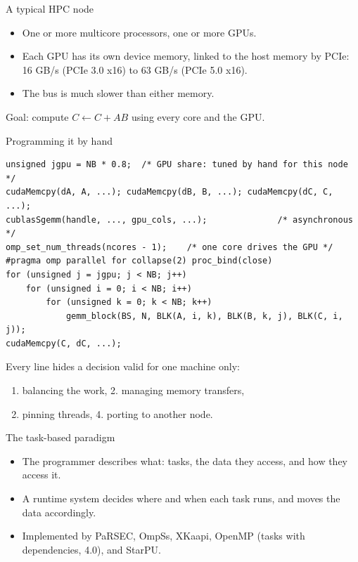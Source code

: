 \documentclass[presentation, aspectratio=169]{beamer}
\begin{document}
\begin{frame}[label={sec:orgd8b34ab}]{A typical HPC node}
\begin{itemize}
\item One or more multicore processors, one or more GPUs.
\item Each GPU has its own \alert{device memory}, linked to the \alert{host memory}
by PCIe: 16 GB/s (PCIe 3.0 x16) to 63 GB/s (PCIe 5.0 x16).
\item The bus is much slower than either memory.
\end{itemize}

Goal: compute \(C \leftarrow C + A B\) using \alert{every} core and the GPU.
\end{frame}
\begin{frame}[label={sec:orgdcf8850},fragile]{Programming it by hand}
 \scriptsize
\begin{verbatim}
unsigned jgpu = NB * 0.8;  /* GPU share: tuned by hand for this node */
cudaMemcpy(dA, A, ...); cudaMemcpy(dB, B, ...); cudaMemcpy(dC, C, ...);
cublasSgemm(handle, ..., gpu_cols, ...);              /* asynchronous */
omp_set_num_threads(ncores - 1);    /* one core drives the GPU */
#pragma omp parallel for collapse(2) proc_bind(close)
for (unsigned j = jgpu; j < NB; j++)
    for (unsigned i = 0; i < NB; i++)
        for (unsigned k = 0; k < NB; k++)
            gemm_block(BS, N, BLK(A, i, k), BLK(B, k, j), BLK(C, i, j));
cudaMemcpy(C, dC, ...);
\end{verbatim}
\normalsize

Every line hides a decision valid for one machine only:
\begin{enumerate}
\item \alert{balancing} the work, 2. \alert{managing} memory transfers,
\item \alert{pinning} threads, 4. \alert{porting} to another node.
\end{enumerate}
\end{frame}
\begin{frame}[label={sec:orgb204e22}]{The task-based paradigm}
\begin{itemize}
\item The programmer describes \alert{what}: tasks, the data they access, and
how they access it.
\item A \alert{runtime system} decides \alert{where} and \alert{when} each task runs, and
moves the data accordingly.
\item Implemented by PaRSEC, OmpSs, XKaapi, OpenMP (tasks with
dependencies, 4.0), and \alert{StarPU}.
\end{itemize}
\end{frame}
\end{document}
